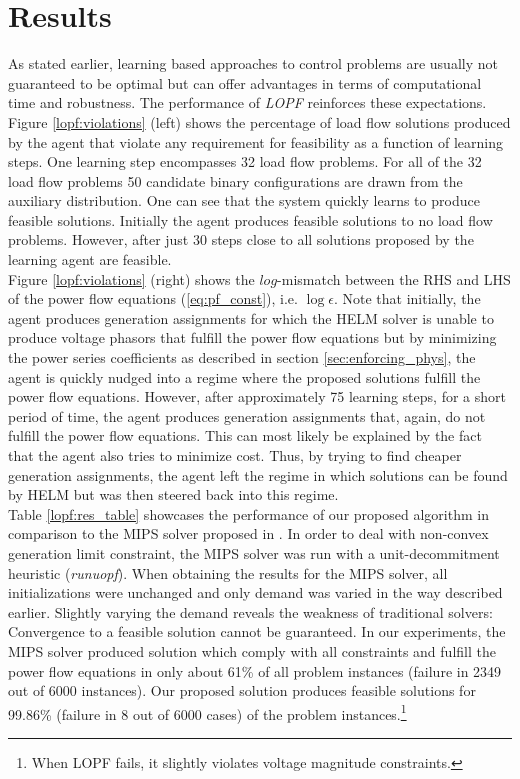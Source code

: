 \section{Results}
\label{sec:LOPFresults}
As stated earlier, learning based approaches to control problems are usually not guaranteed to be optimal but can offer advantages in terms of computational time and robustness. The performance of \emph{LOPF} reinforces these expectations. Figure \ref{lopf:violations} (left) shows the percentage of load flow solutions produced by the agent that violate any requirement for feasibility as a function of learning steps. One learning step encompasses 32 load flow problems. For all of the 32 load flow problems 50 candidate binary configurations are drawn from the auxiliary distribution. One can see that the system quickly learns to produce feasible solutions. Initially the agent produces feasible solutions to no load flow problems. However, after just 30 steps close to all solutions proposed by the learning agent are feasible.\\
Figure \ref{lopf:violations} (right) shows the $log$-mismatch between the RHS and LHS of the power flow equations (\ref{eq:pf_const}), i.e. $\log \epsilon$. Note that initially, the agent produces generation assignments for which the HELM solver is unable to produce voltage phasors that fulfill the power flow equations but by minimizing the power series coefficients as described in section \ref{sec:enforcing_phys}, the agent is quickly nudged into a regime where the proposed solutions fulfill the power flow equations. However, after approximately 75 learning steps, for a short period of time, the agent produces generation assignments that, again, do not fulfill the power flow equations. This can most likely be explained by the fact that the agent also tries to minimize cost. Thus, by trying to find cheaper generation assignments, the agent left the regime in which solutions can be found by HELM but was then steered back into this regime.\\
Table \ref{lopf:res_table} showcases the performance of our proposed algorithm in comparison to the MIPS solver proposed in \cite{zimmerman2011matpower}. In order to deal with non-convex generation limit constraint, the MIPS solver was run with a unit-decommitment heuristic (\emph{runuopf}). When obtaining the results for the MIPS solver, all initializations were unchanged and only demand was varied in the way described earlier. Slightly varying the demand reveals the weakness of traditional solvers: Convergence to a feasible solution cannot be guaranteed. In our experiments, the MIPS solver produced solution which comply with all constraints and fulfill the power flow equations in only about 61\% of all problem instances (failure in 2349 out of 6000 instances). Our proposed solution produces feasible solutions for 99.86\% (failure in 8 out of 6000 cases) of the problem instances.\footnote{When LOPF fails, it slightly violates voltage magnitude constraints.}\\
